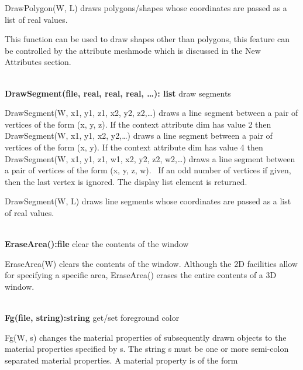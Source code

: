 \documentclass[letterpaper]{article}
\begin{document}
{
DrawPolygon(W, L) draws polygons/shapes whose coordinates are passed as a list of real values.}


\bigskip

This function can be used to draw shapes other than polygons, this
feature can be controlled by the attribute \textsf{meshmode} which is
discussed in the New Attributes section.

\noindent\hrulefill\\
\noindent\textsf{\textbf{DrawSegment(file, real, real, real, {\dots}): list}}
\hfill draw segments


\bigskip

{
\textsf{DrawSegment(W, x1, y1, z1, x2, y2, z2,{\dots})} draws a line segment between a pair of vertices of the form (x,
y, z). If the context attribute \textsf{dim} has value 2 then \textsf{DrawSegment(W, x1, y1, x2, y2,{\dots})} draws a
line segment between a pair of vertices of the form (x, y). If the context attribute \textsf{dim }has value 4 then
\textsf{DrawSegment(W, x1, y1, z1, w1, x2, y2, z2, w2,{\dots})} draws a line segment between a pair of vertices of the
form (x, y, z, w). \ If an odd number of vertices if given, then the last vertex is ignored. The display list element
is returned. }


\bigskip

{
DrawSegment(W, L) draws line segments whose coordinates are passed as a list of real values.}


\bigskip

\noindent\hrulefill\\
\noindent\textsf{\textbf{EraseArea():file}} \hfill clear the contents of the window


\bigskip

\textsf{EraseArea(W)} clears the contents of the window. Although the 2D facilities allow for specifying a specific
area, \textsf{EraseArea()} erases the entire contents of a 3D window.

\noindent\hrulefill\\
\noindent\textsf{\textbf{Fg(file, string):string}} \hfill get/set foreground color


\bigskip

{
\textsf{Fg(W, s)} changes the material properties of subsequently drawn objects to the material properties specified by
s. The string s must be one or more semi-colon separated material properties. A material property is of the form }
\end{document}
